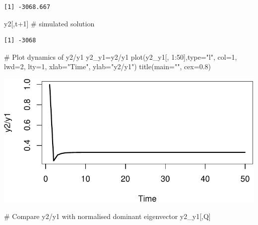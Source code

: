 \documentclass[
  letterpaper,
  DIV=11,
  numbers=noendperiod]{scrreprt}
\newenvironment{Shaded}{\begin{snugshade}}{\end{snugshade}}
\newcommand{\AttributeTok}[1]{\textcolor[rgb]{0.40,0.45,0.13}{#1}}
\newcommand{\CommentTok}[1]{\textcolor[rgb]{0.37,0.37,0.37}{#1}}
\newcommand{\DecValTok}[1]{\textcolor[rgb]{0.68,0.00,0.00}{#1}}
\newcommand{\FloatTok}[1]{\textcolor[rgb]{0.68,0.00,0.00}{#1}}
\newcommand{\FunctionTok}[1]{\textcolor[rgb]{0.28,0.35,0.67}{#1}}
\newcommand{\NormalTok}[1]{\textcolor[rgb]{0.00,0.23,0.31}{#1}}
\newcommand{\OtherTok}[1]{\textcolor[rgb]{0.00,0.23,0.31}{#1}}
\newcommand{\SpecialCharTok}[1]{\textcolor[rgb]{0.37,0.37,0.37}{#1}}
\newcommand{\StringTok}[1]{\textcolor[rgb]{0.13,0.47,0.30}{#1}}
\begin{document}
\begin{verbatim}
[1] -3068.667
\end{verbatim}

\begin{Shaded}
\begin{Highlighting}[]
\NormalTok{y2[,t}\SpecialCharTok{+}\DecValTok{1}\NormalTok{] }\CommentTok{\# simulated solution}
\end{Highlighting}
\end{Shaded}

\begin{verbatim}
[1] -3068
\end{verbatim}

\begin{Shaded}
\begin{Highlighting}[]
\CommentTok{\# Plot dynamics of y2/y1}
\NormalTok{y2\_y1}\OtherTok{=}\NormalTok{y2}\SpecialCharTok{/}\NormalTok{y1}
\FunctionTok{plot}\NormalTok{(y2\_y1[, }\DecValTok{1}\SpecialCharTok{:}\DecValTok{50}\NormalTok{],}\AttributeTok{type=}\StringTok{"l"}\NormalTok{, }\AttributeTok{col=}\DecValTok{1}\NormalTok{, }\AttributeTok{lwd=}\DecValTok{2}\NormalTok{, }\AttributeTok{lty=}\DecValTok{1}\NormalTok{, }\AttributeTok{xlab=}\StringTok{"Time"}\NormalTok{, }\AttributeTok{ylab=}\StringTok{"y2/y1"}\NormalTok{)}
\FunctionTok{title}\NormalTok{(}\AttributeTok{main=}\StringTok{""}\NormalTok{, }\AttributeTok{cex=}\FloatTok{0.8}\NormalTok{)}
\end{Highlighting}
\end{Shaded}

\includegraphics{intro_stability_analysis_files/figure-pdf/stab_analysis2-2.pdf}

\begin{Shaded}
\begin{Highlighting}[]
\CommentTok{\# Compare y2/y1 with normalised dominant eigenvector}
\NormalTok{y2\_y1[,Q]}
\end{Highlighting}
\end{Shaded}
\end{document}
